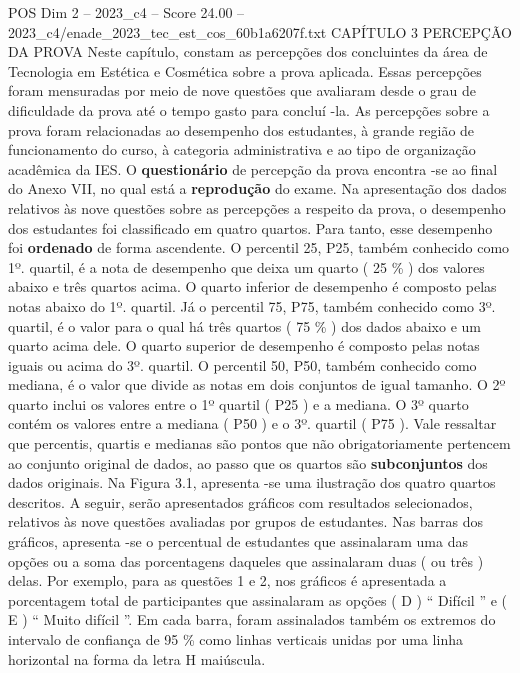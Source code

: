 \begin{textsample}{POS Dim 2 – 2023\_c4 – Score 24.00 – 2023\_c4/enade\_2023\_tec\_est\_cos\_60b1a6207f.txt}  \label{ex:f2_pos_009}
CAPÍTULO 3 PERCEPÇÃO DA PROVA Neste capítulo, constam as percepções dos concluintes da área de Tecnologia em Estética e Cosmética sobre a prova aplicada.
Essas percepções foram mensuradas por meio de nove questões que avaliaram desde o grau de dificuldade da prova até o tempo gasto para concluí -la.
As percepções sobre a prova foram relacionadas ao desempenho dos estudantes, à grande região de funcionamento do curso, à categoria administrativa e ao tipo de organização acadêmica da IES.
O \textbf{questionário} de percepção da prova encontra -se ao final do Anexo VII, no qual está a \textbf{reprodução} do exame.
Na apresentação dos dados relativos às nove questões sobre as percepções a respeito da prova, o desempenho dos estudantes foi classificado em quatro quartos.
Para tanto, esse desempenho foi \textbf{ordenado} de forma ascendente.
O percentil 25, P25, também conhecido como 1º. quartil, é a nota de desempenho que deixa um quarto ( 25 \% ) dos valores abaixo e três quartos acima.
O quarto inferior de desempenho é composto pelas notas abaixo do 1º. quartil.
Já o percentil 75, P75, também conhecido como 3º. quartil, é o valor para o qual há três quartos ( 75 \% ) dos dados abaixo e um quarto acima dele.
O quarto superior de desempenho é composto pelas notas iguais ou acima do 3º. quartil.
O percentil 50, P50, também conhecido como mediana, é o valor que divide as notas em dois conjuntos de igual tamanho.
O 2º quarto inclui os valores entre o 1º quartil ( P25 ) e a mediana.
O 3º quarto contém os valores entre a mediana ( P50 ) e o 3º. quartil ( P75 ).
Vale ressaltar que percentis, quartis e medianas são pontos que não obrigatoriamente pertencem ao conjunto original de dados, ao passo que os quartos são \textbf{subconjuntos} dos dados originais.
Na Figura 3.1, apresenta -se uma ilustração dos quatro quartos descritos.
A seguir, serão apresentados gráficos com resultados selecionados, relativos às nove questões avaliadas por grupos de estudantes.
Nas barras dos gráficos, apresenta -se o percentual de estudantes que assinalaram uma das opções ou a soma das porcentagens daqueles que assinalaram duas ( ou três ) delas.
Por exemplo, para as questões 1 e 2, nos gráficos é apresentada a porcentagem total de participantes que assinalaram as opções ( D ) “ Difícil ” e ( E ) “ Muito difícil ”.
Em cada barra, foram assinalados também os extremos do intervalo de confiança de 95 \% como linhas verticais unidas por uma linha horizontal na forma da letra H maiúscula.

\end{textsample}
